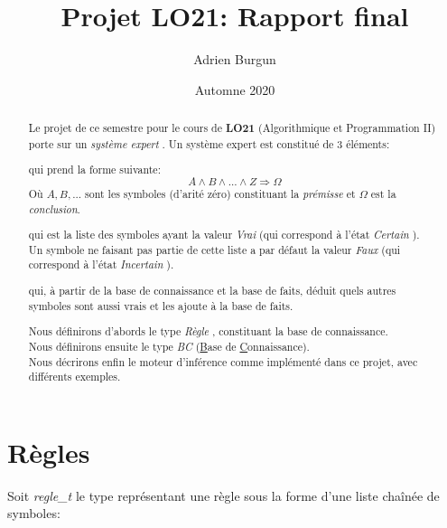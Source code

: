 \documentclass[12pt]{article}
\title{Projet LO21: Rapport final}
\author{Adrien Burgun}
\date{Automne 2020}
\begin{document}
\maketitle

\begin{abstract}

  Le projet de ce semestre pour le cours de \textbf{LO21} (Algorithmique et Programmation II) porte sur un \textit{\og système expert \fg}.
  Un système expert est constitué de 3 éléments:

  \begin{description}[align=left]
    \item [Une base de connaissance,] qui prend la forme suivante:
    \[
      A \wedge B \wedge ... \wedge Z \Rightarrow \Omega
    \]
    Où \(A, B, ...\) sont les symboles (d'arité zéro) constituant la \textit{prémisse} et \(\Omega\) est la \textit{conclusion}.

    \item [Une base de faits,] qui est la liste des symboles ayant la valeur \textit{\og Vrai \fg} (qui correspond à l'état \textit{\og Certain \fg}). \\
    Un symbole ne faisant pas partie de cette liste a par défaut la valeur \textit{\og Faux \fg} (qui correspond à l'état \textit{\og Incertain \fg}).

    \item [Un moteur d'inférence,] qui, à partir de la base de connaissance et la base de faits, déduit quels autres symboles sont aussi vrais et les ajoute à la base de faits.
  \end{description}

  Nous définirons d'abords le type \textit{\og Règle \fg}, constituant la base de connaissance. \\
  Nous définirons ensuite le type \textit{\og BC \fg} (\underline{B}ase de \underline{C}onnaissance). \\
  Nous décrirons enfin le moteur d'inférence comme implémenté dans ce projet, avec différents exemples.
\end{abstract}

\section{Règles}

Soit \textit{regle\_t} le type représentant une règle sous la forme d'une liste chaînée de symboles:

\end{document}
